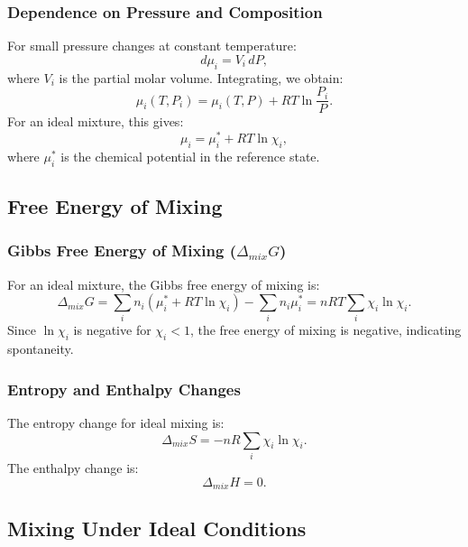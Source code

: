 \documentclass{article}
\theoremstyle{definition}
\begin{document}
\subsubsection{Dependence on Pressure and Composition}
For small pressure changes at constant temperature:
\begin{equation}
d\mu_i = V_i\, dP,
\end{equation}
where \(V_i\) is the partial molar volume. Integrating, we obtain:
\begin{equation}
\mu_i(T,P_i) = \mu_i(T,P) + RT \ln\frac{P_i}{P}.
\end{equation}
For an ideal mixture, this gives:
\begin{equation}
\mu_i = \mu_i^* + RT\ln{\chi_i},
\end{equation}
where \(\mu_i^*\) is the chemical potential in the reference state.

\subsection{Free Energy of Mixing}

\subsubsection{Gibbs Free Energy of Mixing (\(\Delta_{mix}G\))}
For an ideal mixture, the Gibbs free energy of mixing is:
\begin{equation}
\Delta_{mix} G = \sum_i n_i \left(\mu_i^* + RT\ln{\chi_i}\right) - \sum_i n_i\mu_i^* = nRT \sum_i \chi_i\ln{\chi_i}.
\end{equation}
Since \(\ln \chi_i\) is negative for \(\chi_i < 1\), the free energy of mixing is negative, indicating spontaneity.

\subsubsection{Entropy and Enthalpy Changes}
The entropy change for ideal mixing is:
\begin{equation}
\Delta_{mix} S = -nR\sum_i \chi_i\ln{\chi_i}.
\end{equation}
The enthalpy change is:
\begin{equation}
\Delta_{mix} H = 0.
\end{equation}

\subsection{Mixing Under Ideal Conditions}
\end{document}
